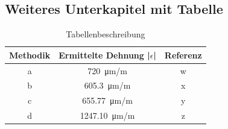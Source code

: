 \subsection{Weiteres Unterkapitel mit Tabelle}
\lipsum[1]
\begin{table}[H]\label{tab:table_description}
	\centering
	\caption{Tabellenbeschreibung}
	\begin{tabular}{|c|c|c|}
	\hline
  	\textbf{Methodik} & \textbf{Ermittelte Dehnung |\textit{$\epsilon$}|} & \textbf{Referenz}\\ \hline
  	a & \SI{720}{\micro\meter/\meter} & w \\ \hline
  	b & \SI{605.3}{\micro\meter/\meter} & x \\ \hline
  	c & \SI{655.77}{\micro\meter/\meter} & y \\ \hline
  	d & \SI{1247.10}{\micro\meter/\meter} & z \\ \hline
	\end{tabular}
\end{table}
